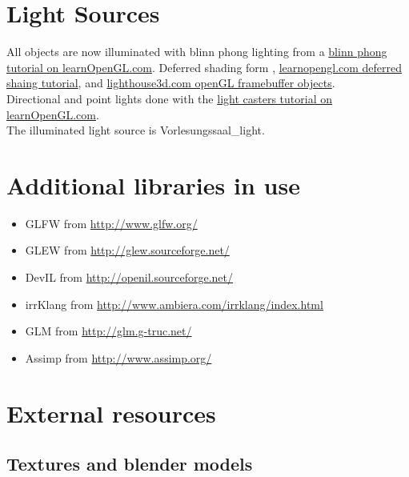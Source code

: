 \documentclass[12pt]{article}
\begin{document}
\section{Light Sources \label{lightSources}}
All objects are now illuminated with blinn phong lighting from a \href{http://learnopengl.com/#!Advanced-Lighting/Advanced-Lighting}{blinn phong tutorial on learnOpenGL.com}. Deferred shading form \cite{openGLSuperBible}, \href{http://learnopengl.com/#!Advanced-Lighting/Deferred-Shading}{learnopengl.com deferred shaing tutorial}, and \href{http://www.lighthouse3d.com/tutorials/opengl_framebuffer_objects/}{lighthouse3d.com openGL framebuffer objects}.\\

Directional and point lights done with the \href{http://learnopengl.com/#!Lighting/Light-casters}{light casters tutorial on learnOpenGL.com}.\\


The illuminated light source is Vorlesungssaal\_light.

\section{Additional libraries in use}

\begin{itemize}
\item GLFW from \url{http://www.glfw.org/}
\item GLEW from \url{http://glew.sourceforge.net/}
\item DevIL from \url{http://openil.sourceforge.net/}
\item irrKlang from \url{http://www.ambiera.com/irrklang/index.html}
\item GLM from \url{http://glm.g-truc.net/}
\item Assimp from \url{http://www.assimp.org/}
\end{itemize}


\section{External resources}

\subsection{Textures and blender models}
\end{document}
